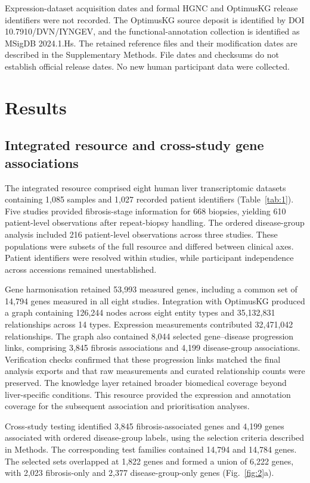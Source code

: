 \documentclass[11pt,a4paper]{article}
\begin{document}
Expression-dataset acquisition dates and formal HGNC and OptimusKG release identifiers were not recorded. The OptimusKG source deposit is identified by DOI 10.7910/DVN/IYNGEV, and the functional-annotation collection is identified as MSigDB 2024.1.Hs. The retained reference files and their modification dates are described in the Supplementary Methods. File dates and checksums do not establish official release dates. No new human participant data were collected.




\section*{Results}




\subsection*{Integrated resource and cross-study gene associations}
The integrated resource comprised eight human liver transcriptomic datasets containing 1,085 samples and 1,027 recorded patient identifiers (Table~\ref{tab:1}). Five studies provided fibrosis-stage information for 668 biopsies, yielding 610 patient-level observations after repeat-biopsy handling. The ordered disease-group analysis included 216 patient-level observations across three studies. These populations were subsets of the full resource and differed between clinical axes. Patient identifiers were resolved within studies, while participant independence across accessions remained unestablished.

Gene harmonisation retained 53,993 measured genes, including a common set of 14,794 genes measured in all eight studies. Integration with OptimusKG produced a graph containing 126,244 nodes across eight entity types and 35,132,831 relationships across 14 types. Expression measurements contributed 32,471,042 relationships. The graph also contained 8,044 selected gene–disease progression links, comprising 3,845 fibrosis associations and 4,199 disease-group associations. Verification checks confirmed that these progression links matched the final analysis exports and that raw measurements and curated relationship counts were preserved. The knowledge layer retained broader biomedical coverage beyond liver-specific conditions. This resource provided the expression and annotation coverage for the subsequent association and prioritisation analyses.

Cross-study testing identified 3,845 fibrosis-associated genes and 4,199 genes associated with ordered disease-group labels, using the selection criteria described in Methods. The corresponding test families contained 14,794 and 14,784 genes. The selected sets overlapped at 1,822 genes and formed a union of 6,222 genes, with 2,023 fibrosis-only and 2,377 disease-group-only genes (Fig.~\ref{fig:2}a).
\end{document}
